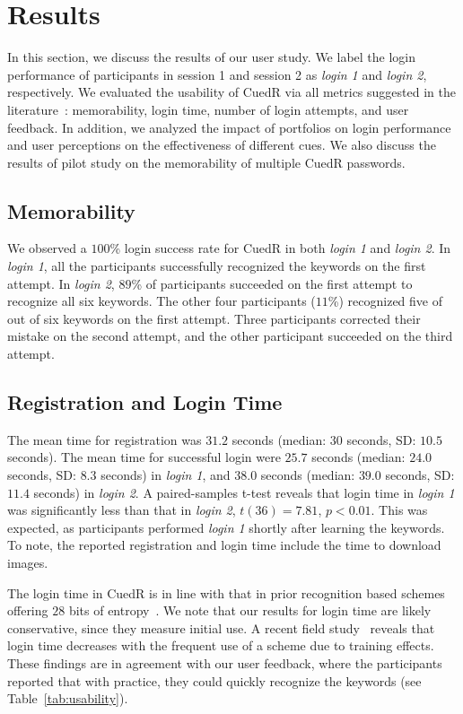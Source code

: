 \section{Results}\label{results}

In this section, we discuss the results of our user study. We label the login performance of participants in session 1 and session 2 as \textit{login 1} and \textit{login 2}, respectively. We evaluated the usability of CuedR via all metrics suggested in the literature~\cite{design_space}: memorability, login time, number of login attempts, and user feedback. In addition, we analyzed the impact of portfolios on login performance and user perceptions on the effectiveness of different cues. We also discuss the results of pilot study on the memorability of multiple CuedR passwords.

\subsection{Memorability}\label{memory}

We observed a $100$\% login success rate for CuedR in both \textit{login 1} and \textit{login 2}. In \textit{login 1}, all the participants successfully recognized the keywords on the first attempt. In \textit{login 2}, $89$\% of participants succeeded on the first attempt to recognize all six keywords. The other four participants ($11$\%) recognized five of out of six keywords on the first attempt. Three participants corrected their mistake on the second attempt, and the other participant succeeded on the third attempt. 

\subsection{Registration and Login Time}\label{time} 

The mean time for registration was $31.2$ seconds (median: $30$ seconds, SD: $10.5$ seconds). The mean time for successful login were $25.7$ seconds (median: $24.0$ seconds, SD: $8.3$ seconds) in \textit{login 1}, and $38.0$ seconds (median: $39.0$ seconds, SD: $11.4$ seconds) in \textit{login 2}. A paired-samples t-test reveals that login time in \textit{login 1} was significantly less than that in \textit{login 2}, $t(36)=7.81$, $p<0.01$. This was expected, as participants performed {\em login 1} shortly after learning the keywords. To note, the reported registration and login time include the time to download images.

The login time in CuedR is in line with that in prior recognition based schemes offering $28$ bits of entropy~\cite{image_type,text_recog}. We note that our results for login time are likely conservative, since they measure initial use. A recent field study~\cite{geopass2} reveals that login time decreases with the frequent use of a scheme due to training effects. These findings are in agreement with our user feedback, where the participants reported that with practice, they could quickly recognize the keywords (see Table~\ref{tab:usability}). 

